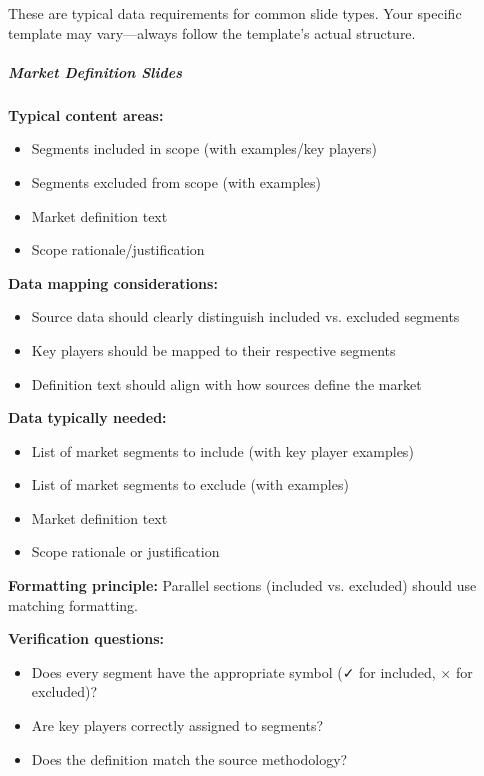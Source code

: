 \documentclass[11pt]{article}
\begin{document}
These are typical data requirements for common slide types. Your specific template may vary—always follow the template's actual structure.


\subparagraph{Market Definition Slides}\mbox{}\par

\textbf{Typical content areas:}

\begin{itemize}[leftmargin=*,itemsep=2pt,topsep=2pt]
\item {} Segments included in scope (with examples/key players)
\item {} Segments excluded from scope (with examples)
\item {} Market definition text
\item {} Scope rationale/justification
\end{itemize}

\textbf{Data mapping considerations:}

\begin{itemize}[leftmargin=*,itemsep=2pt,topsep=2pt]
\item {} Source data should clearly distinguish included vs. excluded segments
\item {} Key players should be mapped to their respective segments
\item {} Definition text should align with how sources define the market
\end{itemize}

\textbf{Data typically needed:}

\begin{itemize}[leftmargin=*,itemsep=2pt,topsep=2pt]
\item {} List of market segments to include (with key player examples)
\item {} List of market segments to exclude (with examples)
\item {} Market definition text
\item {} Scope rationale or justification
\end{itemize}

\textbf{Formatting principle:} Parallel sections (included vs. excluded) should use matching formatting.


\textbf{Verification questions:}

\begin{itemize}[leftmargin=*,itemsep=2pt,topsep=2pt]
\item {} Does every segment have the appropriate symbol (✓ for included, × for excluded)?
\item {} Are key players correctly assigned to segments?
\item {} Does the definition match the source methodology?
\end{itemize}
\end{document}
